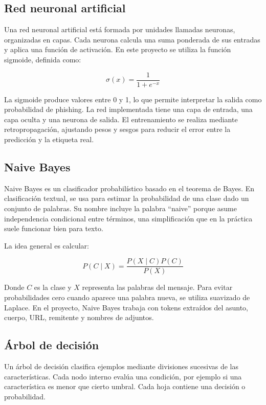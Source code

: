 \documentclass[12pt,letterpaper]{article}
\begin{document}
\subsection{Red neuronal artificial}

Una red neuronal artificial está formada por unidades llamadas neuronas, organizadas en capas. Cada neurona calcula una suma ponderada de sus entradas y aplica una función de activación. En este proyecto se utiliza la función sigmoide, definida como:

\[
\sigma(x) = \frac{1}{1 + e^{-x}}
\]

La sigmoide produce valores entre 0 y 1, lo que permite interpretar la salida como probabilidad de phishing. La red implementada tiene una capa de entrada, una capa oculta y una neurona de salida. El entrenamiento se realiza mediante retropropagación, ajustando pesos y sesgos para reducir el error entre la predicción y la etiqueta real.

\subsection{Naive Bayes}

Naive Bayes es un clasificador probabilístico basado en el teorema de Bayes. En clasificación textual, se usa para estimar la probabilidad de una clase dado un conjunto de palabras. Su nombre incluye la palabra ``naive'' porque asume independencia condicional entre términos, una simplificación que en la práctica suele funcionar bien para texto.

La idea general es calcular:

\[
P(C \mid X) = \frac{P(X \mid C)P(C)}{P(X)}
\]

Donde \(C\) es la clase y \(X\) representa las palabras del mensaje. Para evitar probabilidades cero cuando aparece una palabra nueva, se utiliza suavizado de Laplace. En el proyecto, Naive Bayes trabaja con tokens extraídos del asunto, cuerpo, URL, remitente y nombres de adjuntos.

\subsection{Árbol de decisión}

Un árbol de decisión clasifica ejemplos mediante divisiones sucesivas de las características. Cada nodo interno evalúa una condición, por ejemplo si una característica es menor que cierto umbral. Cada hoja contiene una decisión o probabilidad.
\end{document}
